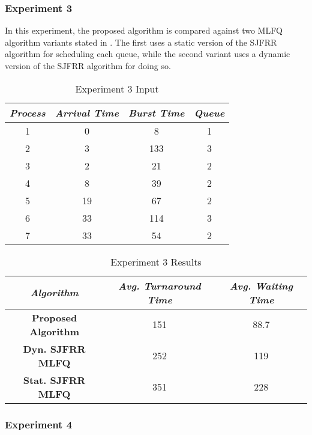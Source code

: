 \documentclass[conference]{IEEEtran}
\newcommand\T{\rule{0pt}{2.6ex}}       %
\newcommand\B{\rule[-1.2ex]{0pt}{0pt}} %
\begin{document}
\subsubsection{Experiment 3}

In this experiment, the proposed algorithm is compared against two MLFQ algorithm variants stated in \cite{b5}. The first uses a static version of the SJFRR algorithm for scheduling each queue, while the second variant uses a dynamic version of the SJFRR algorithm for doing so.

\begin{table}[H]
    \caption{Experiment 3 Input}
    \centering
     \begin{tabular}{||c c c c||} 
     \hline
     \textit{\textbf{Process}} & \textit{\textbf{Arrival Time}} & \textit{\textbf{Burst Time}} & \textit{\textbf{Queue}} \T \B \\ 
     \hline
     \hline
     1 & 0 & 8 & 1 \T \B \\ 
     \hline
     2 & 3 & 133 & 3 \T \B \\
     \hline
     3 & 2 & 21 & 2 \T \B \\
     \hline
     4 & 8 & 39 & 2 \T \B \\
     \hline
     5 & 19 & 67 & 2 \T \B \\ 
     \hline
     6 & 33 & 114 & 3 \T \B \\ 
     \hline
     7 & 33 & 54 & 2 \T \B \\ 
     \hline
     \end{tabular}
\end{table}

\begin{table}[H]
    \caption{Experiment 3 Results}
    \centering
    \begin{tabular}{||c c c||}
        \hline
        \textit{\textbf{Algorithm}} & \textit{\textbf{Avg. Turnaround Time}} & \textit{\textbf{Avg. Waiting Time}}\T \B \\
    \hline
    \hline
    \textbf{Proposed Algorithm} & 151 & 88.7 \T \B\\ \hline
    \textbf{Dyn. SJFRR MLFQ} & 252 & 119 \T \B\\ \hline
    \textbf{Stat. SJFRR MLFQ} & 351 & 228 \T \B\\ \hline
     \end{tabular}
\end{table}

\subsubsection{Experiment 4}
\end{document}
